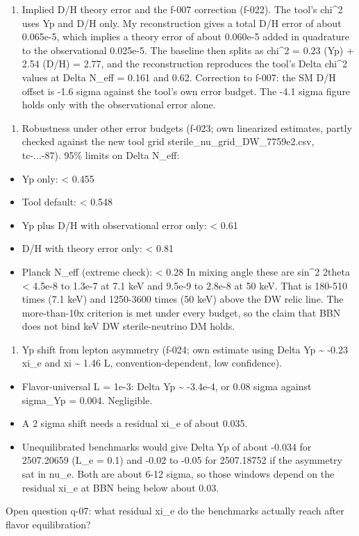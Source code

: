 \documentclass[11pt,a4paper]{article}
\begin{document}
\begin{enumerate}
  \item Implied D/H theory error and the f-007 correction (f-022). The tool's chi\textasciicircum{}2 uses Yp and D/H only. My reconstruction gives a total D/H error of about 0.065e-5, which implies a theory error of about 0.060e-5 added in quadrature to the observational 0.025e-5. The baseline then splits as chi\textasciicircum{}2 = 0.23 (Yp) + 2.54 (D/H) = 2.77, and the reconstruction reproduces the tool's Delta chi\textasciicircum{}2 values at Delta N\_eff = 0.161 and 0.62. Correction to f-007: the SM D/H offset is -1.6 sigma against the tool's own error budget. The -4.1 sigma figure holds only with the observational error alone.
\end{enumerate}
\begin{enumerate}
  \item Robustness under other error budgets (f-023; own linearized estimates, partly checked against the new tool grid sterile\_nu\_grid\_DW\_7759e2.csv, tc-...-87). 95\% limits on Delta N\_eff:
\end{enumerate}
\begin{itemize}
  \item Yp only: \textless{} 0.455
  \item Tool default: \textless{} 0.548
  \item Yp plus D/H with observational error only: \textless{} 0.61
  \item D/H with theory error only: \textless{} 0.81
  \item Planck N\_eff (extreme check): \textless{} 0.28
In mixing angle these are sin\textasciicircum{}2 2theta \textless{} 4.5e-8 to 1.3e-7 at 7.1 keV and 9.5e-9 to 2.8e-8 at 50 keV. That is 180-510 times (7.1 keV) and 1250-3600 times (50 keV) above the DW relic line. The more-than-10x criterion is met under every budget, so the claim that BBN does not bind keV DW sterile-neutrino DM holds.

\end{itemize}
\begin{enumerate}
  \item Yp shift from lepton asymmetry (f-024; own estimate using Delta Yp \textasciitilde{} -0.23 xi\_e and xi \textasciitilde{} 1.46 L, convention-dependent, low confidence).
\end{enumerate}
\begin{itemize}
  \item Flavor-universal L = 1e-3: Delta Yp \textasciitilde{} -3.4e-4, or 0.08 sigma against sigma\_Yp = 0.004. Negligible.
  \item A 2 sigma shift needs a residual xi\_e of about 0.035.
  \item Unequilibrated benchmarks would give Delta Yp of about -0.034 for 2507.20659 (L\_e = 0.1) and -0.02 to -0.05 for 2507.18752 if the asymmetry sat in nu\_e. Both are about 6-12 sigma, so those windows depend on the residual xi\_e at BBN being below about 0.03.
\end{itemize}
Open question q-07: what residual xi\_e do the benchmarks actually reach after flavor equilibration?
\end{document}
